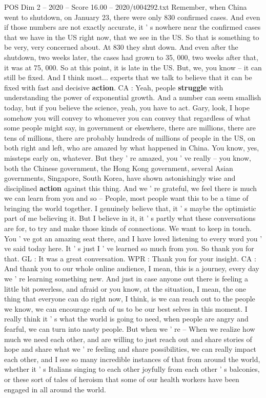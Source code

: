 \begin{textsample}{POS Dim 2 – 2020 – Score 16.00 – 2020/t004292.txt}
Remember, when China went to shutdown, on January 23, there were only 830 confirmed cases.
And even if those numbers are not exactly accurate, it ' s nowhere near the confirmed cases that we have in the US right now, that we see in the US.
So that is something to be very, very concerned about.
At 830 they shut down.
And even after the shutdown, two weeks later, the cases had grown to 35, 000, two weeks after that, it was at 75, 000.
So at this point, it is late in the US.
But, we, you know -- it can still be fixed.
And I think most... experts that we talk to believe that it can be fixed with fast and decisive \textbf{action}.
CA : Yeah, people \textbf{struggle} with understanding the power of exponential growth.
And a number can seem smallish today, but if you believe the science, yeah, you have to act.
Gary, look, I hope somehow you will convey to whomever you can convey that regardless of what some people might say, in government or elsewhere, there are millions, there are tens of millions, there are probably hundreds of millions of people in the US, on both right and left, who are amazed by what happened in China.
You know, yes, missteps early on, whatever.
But they ' re amazed, you ' ve really -- you know, both the Chinese government, the Hong Kong government, several Asian governments, Singapore, South Korea, have shown astonishingly wise and disciplined \textbf{action} against this thing.
And we ' re grateful, we feel there is much we can learn from you and so -- People, most people want this to be a time of bringing the world together.
I genuinely believe that, it ' s maybe the optimistic part of me believing it.
But I believe in it, it ' s partly what these conversations are for, to try and make those kinds of connections.
We want to keep in touch.
You ' ve got an amazing seat there, and I have loved listening to every word you ' ve said today here.
It ' s just I ' ve learned so much from you.
So thank you for that.
GL : It was a great conversation.
WPR : Thank you for your insight.
CA : And thank you to our whole online audience, I mean, this is a journey, every day we ' re learning something new.
And just in case anyone out there is feeling a little bit powerless, and afraid or you know, at the situation, I mean, the one thing that everyone can do right now, I think, is we can reach out to the people we know, we can encourage each of us to be our best selves in this moment.
I really think it ' s what the world is going to need, when people are angry and fearful, we can turn into nasty people.
But when we ' re -- When we realize how much we need each other, and are willing to just reach out and share stories of hope and share what we ' re feeling and share possibilities, we can really impact each other, and I see so many incredible instances of that from around the world, whether it ' s Italians singing to each other joyfully from each other ' s balconies, or these sort of tales of heroism that some of our health workers have been engaged in all around the world.

\end{textsample}
